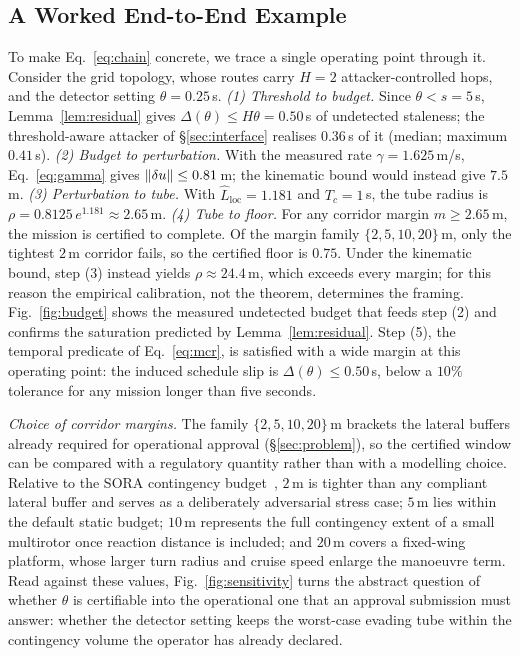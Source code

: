 \begin{table}[t]
\centering
\caption{Instantiated constants and their provenance. The only numeric constant
still pending is the PAC--Bayes prior/posterior KL, which is flagged rather than
substituted.}
\label{tab:constants}
\small
\renewcommand{\arraystretch}{1.05}

\end{table}

\subsection{A Worked End-to-End Example}
\label{sec:worked}
To make Eq.~\eqref{eq:chain} concrete, we trace a single operating point through
it. Consider the grid topology, whose routes carry $H=2$ attacker-controlled
hops, and the detector setting $\theta=0.25$\,s. \emph{(1) Threshold to budget.}
Since $\theta<s=5$\,s, Lemma~\ref{lem:residual} gives $\Delta(\theta)\le H\theta=0.50$\,s
of undetected staleness; the threshold-aware attacker of \S\ref{sec:interface}
realises $0.36$\,s of it (median; maximum $0.41$\,s). \emph{(2) Budget to perturbation.} With the measured
rate $\gamma=1.625$\,m/s, Eq.~\eqref{eq:gamma} gives
$\left\lVert \delta u\right\rVert\le0.81$\,m; the kinematic bound would instead give $7.5$\,m.
\emph{(3) Perturbation to tube.} With $\hat L_{\mathrm{loc}}=1.181$ and
$T_c=1$\,s, the tube radius is $\rho=0.8125\,e^{1.181}\approx2.65$\,m.
\emph{(4) Tube to floor.} For any corridor margin $m\ge2.65$\,m, the mission is
certified to complete. Of the margin family $\{2,5,10,20\}$\,m, only the
tightest $2$\,m corridor fails, so the certified floor is $0.75$. Under the
kinematic bound, step (3) instead yields $\rho\approx24.4$\,m, which exceeds
every margin; for this reason the empirical calibration, not the theorem,
determines the framing.
Fig.~\ref{fig:budget} shows the measured undetected budget that feeds step (2)
and confirms the saturation predicted by Lemma~\ref{lem:residual}. Step (5), the
temporal predicate of Eq.~\eqref{eq:mcr}, is satisfied with a wide margin at this
operating point: the induced schedule slip is $\Delta(\theta)\le0.50$\,s,
below a $10\%$ tolerance for any mission longer than five seconds.

\emph{Choice of corridor margins.} The family $\{2,5,10,20\}$\,m brackets the
lateral buffers already required for operational approval
(\S\ref{sec:problem}), so the certified window can be compared with a
regulatory quantity rather than with a modelling choice. Relative to the SORA
contingency budget~\cite{jarus_sora25,easa_uspace2021}, $2$\,m is tighter than
any compliant lateral buffer and serves as a deliberately adversarial stress
case; $5$\,m lies within the default static budget; $10$\,m represents the full
contingency extent of a small multirotor once reaction distance is included;
and $20$\,m covers a fixed-wing platform, whose larger turn radius and cruise
speed enlarge the manoeuvre term. Read against these values,
Fig.~\ref{fig:sensitivity} turns the abstract question of whether $\theta$ is
certifiable into the operational one that an approval submission must
answer: whether the detector setting keeps the worst-case evading tube within
the contingency volume the operator has already declared.

